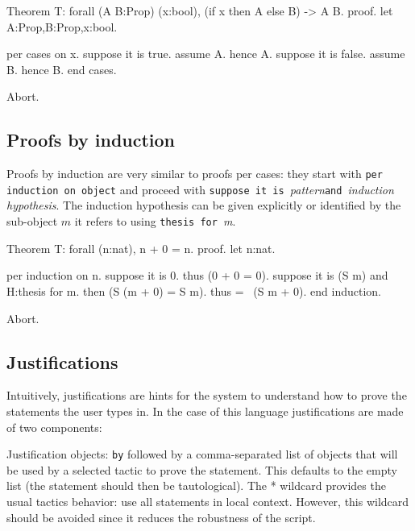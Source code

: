 \begin{coq_eval}
Theorem T: forall (A B:Prop) (x:bool), (if x then A else B) -> A \/ B.
proof.
let A:Prop,B:Prop,x:bool.
\end{coq_eval} 
\begin{coq_example}
per cases on x.
suppose it is true.
  assume A.
  hence A.
suppose it is false.
  assume B.
  hence B.
end cases.
\end{coq_example}
\begin{coq_eval}
Abort.
\end{coq_eval}

\subsection{Proofs by induction} 

Proofs by induction are very similar to proofs per cases: they start
with {\tt per induction on }{\tt object} and proceed with {\tt suppose
  it is }\emph{pattern}{\tt and }\emph{induction hypothesis}. The
induction hypothesis can be given explicitly or identified by the
sub-object $m$ it refers to using {\tt thesis for }\emph{m}. 

\begin{coq_eval}
Theorem T: forall (n:nat), n + 0 = n.
proof.
let n:nat.
\end{coq_eval} 
\begin{coq_example}
per induction on n.
suppose it is 0.
  thus (0 + 0 = 0).
suppose it is (S m) and H:thesis for m.
  then (S (m + 0) = S m).
  thus =~ (S m + 0).
end induction.
\end{coq_example}
\begin{coq_eval}
Abort.
\end{coq_eval}

\subsection{Justifications}\label{justifications}


Intuitively, justifications are hints for the system to understand how
to prove the statements the user types in. In the case of this
language justifications are made of two components:

Justification objects: {\texttt{by}} followed by a comma-{}separated
list of objects that will be used by a selected tactic to prove the
statement. This defaults to the empty list (the statement should then
be tautological). The * wildcard provides the usual tactics behavior:
use all statements in local context. However, this wildcard should be
avoided since it reduces the robustness of the script.

